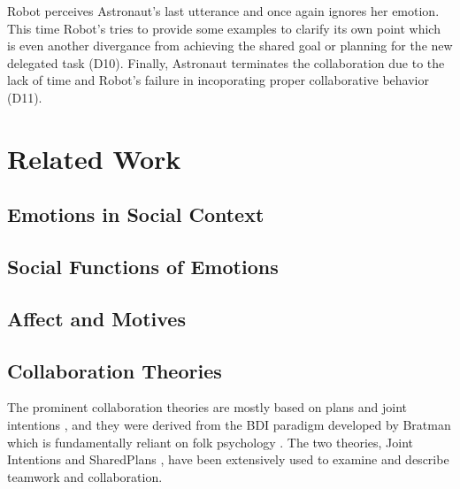 Robot perceives Astronaut's last utterance and once again ignores her emotion.
This time Robot's tries to provide some examples to clarify its own point
which is even another divergance from achieving the shared goal or planning
for the new delegated task (D10). Finally, Astronaut terminates the
collaboration due to the lack of time and Robot's failure in incoporating
proper collaborative behavior (D11).\\

\noindent{}

\section{Related Work}

\subsection{Emotions in Social Context}

\subsection{Social Functions of Emotions}

\subsection{Affect and Motives}

\subsection{Collaboration Theories}
\label{sec:collaboration-theory}

The prominent collaboration theories are mostly based on plans and joint
intentions
\cite{cohen:teamwork,grosz:plans-discourse,Litman:discourse-commonsense}, and
they were derived from the BDI paradigm developed by Bratman
\cite{bratman:intentions-plans} which is fundamentally reliant on folk
psychology \cite{ravenscroft:folk}. The two theories, Joint Intentions
\cite{cohen:teamwork} and SharedPlans \cite{grosz:plans-discourse}, have been
extensively used to examine and describe teamwork and collaboration.

